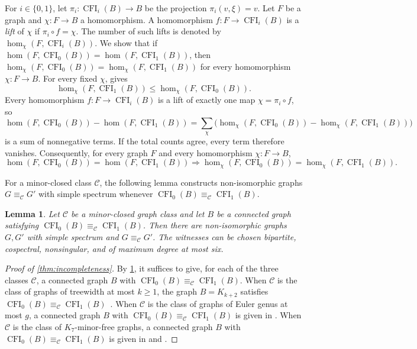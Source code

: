 \documentclass[10pt,a4paper]{article}
\theoremstyle{plain}
\newtheorem{lemma}[theorem]{Lemma}
\theoremstyle{definition}
\DeclareMathOperator{\CFI}{CFI}
\begin{document}
For $i\in\{0,1\}$, let $\pi_i:\CFI_i(B)\to B$ be the projection
$\pi_i(v,\xi)=v$.
Let $F$ be a graph and $\chi:F\to B$ a homomorphism.
A homomorphism $f:F\to\CFI_i(B)$ is a \emph{lift} of $\chi$ if
$\pi_i\circ f=\chi$.
The number of such lifts is denoted by $\hom_\chi(F,\CFI_i(B))$.
We show that if $\hom(F,\CFI_0(B))=\hom(F,\CFI_1(B))$, then
$\hom_\chi(F,\CFI_0(B))=\hom_\chi(F,\CFI_1(B))$ for every homomorphism
$\chi:F\to B$.
For every fixed $\chi$, \cite[Theorem~3.6]{Roberson2026} gives
\begin{equation}\label{eq:ss-coloured-monotonicity}
  \hom_\chi(F,\CFI_1(B))\leq\hom_\chi(F,\CFI_0(B)).
\end{equation}
Every homomorphism $f:F\to\CFI_i(B)$ is a lift of exactly one map
$\chi=\pi_i\circ f$, so
\begin{equation}\label{eq:ss-lift-differences}
 \hom(F,\CFI_0(B))-\hom(F,\CFI_1(B))
 =\sum_\chi\bigl(\hom_\chi(F,\CFI_0(B))-\hom_\chi(F,\CFI_1(B))\bigr)
\end{equation}
is a sum of nonnegative terms. If the total counts agree, every term
therefore vanishes.
Consequently, for every graph $F$ and every homomorphism
$\chi:F\to B$,
\begin{equation}\label{eq:ss-lift-equality}
 \hom(F,\CFI_0(B))=\hom(F,\CFI_1(B))
 \Longrightarrow
 \hom_\chi(F,\CFI_0(B))=\hom_\chi(F,\CFI_1(B)).
\end{equation}

For a minor-closed class $\mathcal C$, the following lemma constructs
non-isomorphic graphs $G\equiv_{\mathcal C}G'$ with simple spectrum
whenever $\CFI_0(B)\equiv_{\mathcal C}\CFI_1(B)$.

\begin{lemma}\label{lem:ss-transfer}
Let $\mathcal C$ be a minor-closed graph class and let $B$ be a connected
graph satisfying $\CFI_0(B)\equiv_{\mathcal C}\CFI_1(B)$. Then there are non-isomorphic
graphs $G,G'$ with simple spectrum and $G\equiv_{\mathcal C}G'$.
The witnesses can be chosen bipartite, cospectral, nonsingular, and of
maximum degree at most six.
\end{lemma}

\begin{proof}[Proof of \cref{thm:incompleteness}]
By \cref{lem:ss-transfer}, it suffices to give, for each of the three
classes $\mathcal C$, a connected graph $B$ with
$\CFI_0(B)\equiv_{\mathcal C}\CFI_1(B)$.
When $\mathcal C$ is the class of graphs of treewidth at most $k\geq1$, the graph
$B=K_{k+2}$ satisfies
$\CFI_0(B)\equiv_{\mathcal C}\CFI_1(B)$~\cite[Theorem~10 and Lemma~12]{Neuen2024}.
When $\mathcal C$ is the class of graphs of Euler genus at most $g$, a connected
graph $B$ with $\CFI_0(B)\equiv_{\mathcal C}\CFI_1(B)$ is given in
\cite[Lemma~2.10 and proof of Theorem~1.8]{NeuenSeppelt2026}.
When $\mathcal C$ is the class of $K_7$-minor-free graphs, a connected graph $B$ with
$\CFI_0(B)\equiv_{\mathcal C}\CFI_1(B)$ is given in
\cite[Lemma~2.10 and proof of Theorem~1.9]{NeuenSeppelt2026}
and \cite[Theorem~1.7 and Section~1.3]{ThilikosWiederrecht2024}.
\end{proof}
\end{document}
